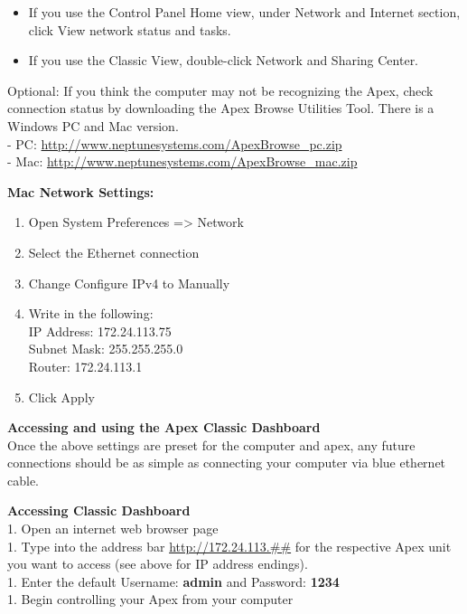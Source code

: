 \documentclass[
]{book}
\providecommand{\tightlist}{%
  \setlength{\itemsep}{0pt}\setlength{\parskip}{0pt}}
\begin{document}
\begin{itemize}
  \begin{itemize}
  \tightlist
  \item
    If you use the Control Panel Home view, under Network and Internet section, click View network status and tasks.\\
  \item
    If you use the Classic View, double-click Network and Sharing Center.
  \end{itemize}
\end{itemize}

Optional: If you think the computer may not be recognizing the Apex, check connection status by downloading the Apex Browse Utilities Tool. There is a Windows PC and Mac version.\\
- PC: \url{http://www.neptunesystems.com/ApexBrowse_pc.zip}\\
- Mac: \url{http://www.neptunesystems.com/ApexBrowse_mac.zip}

\textbf{Mac Network Settings:}

\begin{enumerate}
\def\labelenumi{\arabic{enumi}.}
\tightlist
\item
  Open System Preferences =\textgreater{} Network\\
\item
  Select the Ethernet connection\\
\item
  Change Configure IPv4 to Manually\\
\item
  Write in the following:\\
  IP Address: 172.24.113.75\\
  Subnet Mask: 255.255.255.0\\
  Router: 172.24.113.1\\
\item
  Click Apply
\end{enumerate}

\textbf{Accessing and using the Apex Classic Dashboard}\\
Once the above settings are preset for the computer and apex, any future connections should be as simple as connecting your computer via blue ethernet cable.

\textbf{Accessing Classic Dashboard}\\
1. Open an internet web browser page\\
1. Type into the address bar \url{http://172.24.113.\#\#} for the respective Apex unit you want to access (see above for IP address endings).\\
1. Enter the default Username: \textbf{admin} and Password: \textbf{1234}\\
1. Begin controlling your Apex from your computer
\end{document}
